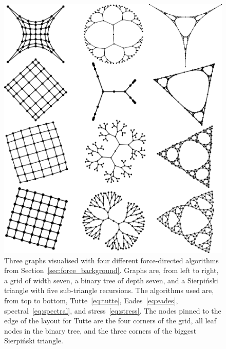 \begin{figure}
  \centering
  \includegraphics[width=1.03\textwidth]{stress/force.pdf}
  \caption[A gallery of node layout methods]{
  Three graphs visualised with four different force-directed algorithms from Section~\ref{sec:force_background}. Graphs are, from left to right, a grid of width seven, a binary tree of depth seven, and a Sierpi\'nski triangle \cite{Sierpinski1915} with five sub-triangle recursions.
  The algorithms used are, from top to bottom, Tutte~\eqref{eq:tutte}, Eades~\eqref{eq:eades}, spectral~\eqref{eq:spectral}, and stress~\eqref{eq:stress}.
  The nodes pinned to the edge of the layout for Tutte are the four corners of the grid, all leaf nodes in the binary tree, and the three corners of the biggest Sierpi\'nski triangle.}
  \label{fig:misc_force_layouts}
\end{figure}

